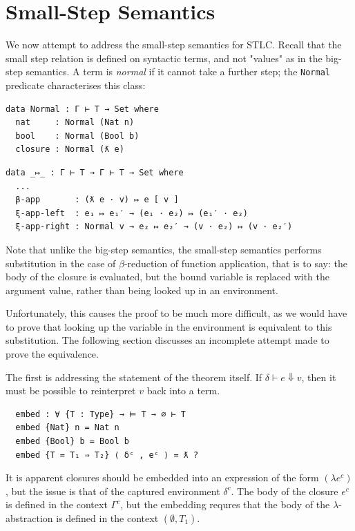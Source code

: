 \section{Small-Step Semantics}
We now attempt to address the small-step semantics for STLC. Recall that the small step relation is defined on syntactic terms, and not "values" as in the big-step semantics.
A term is \emph{normal} if it cannot take a further step; the \texttt{Normal}
predicate characterises this class:

\begin{verbatim}
data Normal : Γ ⊢ T → Set where
  nat     : Normal (Nat n)
  bool    : Normal (Bool b)
  closure : Normal (ƛ e)
\end{verbatim}

\begin{verbatim}
data _↦_ : Γ ⊢ T → Γ ⊢ T → Set where
  ...
  β-app       : (ƛ e · v) ↦ e [ v ]
  ξ-app-left  : e₁ ↦ e₁′ → (e₁ · e₂) ↦ (e₁′ · e₂)
  ξ-app-right : Normal v → e₂ ↦ e₂′ → (v · e₂) ↦ (v · e₂′)  
\end{verbatim}

Note that unlike the big-step semantics, the small-step semantics performs substitution in the case of $\beta$-reduction of function application,
that is to say: the body of the closure is evaluated, but the bound variable is replaced with the argument value, rather than being looked up in an environment.

Unfortunately, this causes the proof to be much more difficult, as we would have to prove that looking up the variable in the environment is equivalent to this substitution. 
The following section discusses an incomplete attempt made to prove the equivalence.

The first is addressing the statement of the theorem itself. If $\delta \vdash e \Downarrow v$, then it must be possible to reinterpret $v$ back into a term.
\begin{verbatim}
  embed : ∀ {T : Type} → ⊨ T → ∅ ⊢ T
  embed {Nat} n = Nat n
  embed {Bool} b = Bool b
  embed {T = T₁ ⇒ T₂} ⟨ δᶜ , eᶜ ⟩ = ƛ ?
\end{verbatim}

It is apparent closures should be embedded into an expression of the form $(\lambda e^c)$, but the issue is that of the captured environment $\delta^c$.
The body of the closure $e^c$ is defined in the context $\Gamma^c$, but the embedding requres that the body of the $\lambda$-abstraction is defined in the context $(\emptyset , T_1)$.

